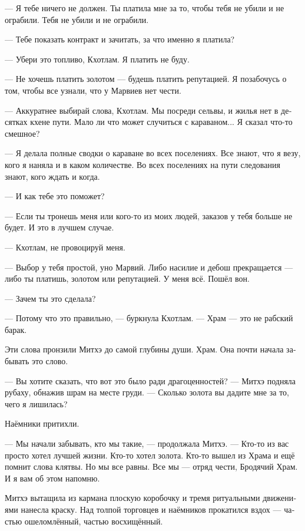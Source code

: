 \documentclass[a4paper,12pt,fleqn]{book}\usepackage{cooltooltips}\usepackage{polyglossia}\setdefaultlanguage[babelshorthands=true]{russian}\setotherlanguage{english}\defaultfontfeatures{Ligatures=TeX,Mapping=tex-text} \usepackage{xcolor}\definecolor{lightgray}{HTML}{bbbbbb}\color{lightgray}\newcommand{\ml}[3]{\textenglish{\textcolor{black}{#3}} }
\newcommand{\asterism}{\vspace{1em}{\centering\Large\bfseries$\ast~\ast~\ast$\par}\vspace{1em}}
\begin{document}
--- Я тебе ничего не должен.
Ты платила мне за то, чтобы тебя не убили и не ограбили.
Тебя не убили и не ограбили.

--- Тебе показать контракт и зачитать, за что именно я платила?

--- Убери это топливо, Кхотлам.
Я платить не буду.

--- Не хочешь платить золотом --- будешь платить репутацией.
Я позабочусь о том, чтобы все узнали, что у Марвиев нет чести.

--- Аккуратнее выбирай слова, Кхотлам.
Мы посреди сельвы, и жилья нет в десятках кхене пути.
Мало ли что может случиться с караваном...
Я сказал что-то смешное?

--- Я делала полные сводки о караване во всех поселениях.
Все знают, что я везу, кого я наняла и в каком количестве.
Во всех поселениях на пути следования знают, кого ждать и когда.

--- И как тебе это поможет?

--- Если ты тронешь меня или кого-то из моих людей, заказов у тебя больше не будет.
И это в лучшем случае.

--- Кхотлам, не провоцируй меня.

--- Выбор у тебя простой, уно Марвий.
Либо насилие и дебош прекращается --- либо ты платишь, золотом или репутацией.
У меня всё.
Пошёл вон.

\asterism

--- Зачем ты это сделала?

--- Потому что это правильно, --- буркнула Кхотлам.
--- Храм --- это не рабский барак.

Эти слова пронзили Митхэ до самой глубины души.
Храм.
Она почти начала забывать это слово.

\asterism

--- Вы хотите сказать, что вот это было ради драгоценностей? --- Митхэ подняла рубаху, обнажив шрам на месте груди.
--- Сколько золота вы дадите мне за то, чего я лишилась?

Наёмники притихли.

--- Мы начали забывать, кто мы такие, --- продолжала Митхэ.
--- Кто-то из вас просто хотел лучшей жизни.
Кто-то хотел золота.
Кто-то вышел из Храма и ещё помнит слова клятвы.
Но мы все равны.
Все мы --- отряд чести, Бродячий Храм.
И я вам об этом напомню.

Митхэ вытащила из кармана плоскую коробочку и тремя ритуальными движениями нанесла краску.
Над толпой торговцев и наёмников прокатился вздох --- частью ошеломлённый, частью восхищённый.
\end{document}

